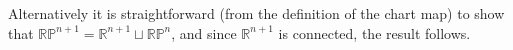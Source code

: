 \documentclass{amsbook}
\theoremstyle{theorem}
\theoremstyle{plain}
\theoremstyle{remark}
\newcommand{\R}{\mathbb R}
\renewcommand{\P}{\mathbb P}
\begin{document}
Alternatively it is straightforward (from the definition of the chart map) to show that $\R\P^{n+1} = \R^{n+1} \sqcup \R\P^n$, and since $\R^{n+1}$ is connected, the result follows.




% 
% 

\end{document}
